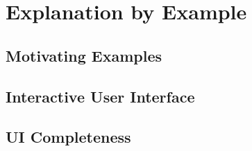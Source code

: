 \section{Explanation by Example}
\label{sec:explanation}

\subsection{Motivating Examples}
\label{sec:motivating-examples}

\subsection{Interactive User Interface}
\label{sec:ui}

\subsection{UI Completeness}
\label{sec:ui-completeness}

